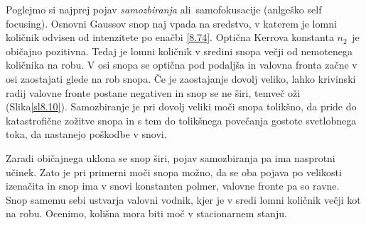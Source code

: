 \documentclass[11pt,fleqn]{book} %
\begin{document}
Poglejmo si najprej pojav \textit{samozbiranja }ali\textit{\ }samofokusacije
(anlgeško self focusing). Osnovni Gaussov snop naj vpada na sredstvo,
v katerem je lomni količnik odvisen od intenzitete po enačbi \ref{8.74}.
Optična Kerrova konstanta $n_{2\text{ }}$je običajno pozitivna. Tedaj
je lomni količnik v sredini snopa večji od nemotenega količnika na
robu. V osi snopa se optična pod podaljša in valovna fronta začne
v osi zaostajati glede na rob snopa. Če je zaostajanje dovolj veliko,
lahko krivinski radij valovne fronte postane negativen in snop se
ne širi, temveč oži (Slika\ref{sl8.10}). Samozbiranje je pri dovolj
veliki moči snopa tolikšno, da pride do katastrofične zožitve snopa
in s tem do tolikšnega povečanja gostote svetlobnega toka, da nastanejo
poškodbe v snovi.

Zaradi običajnega uklona se snop širi, pojav samozbiranja pa ima nasprotni
učinek. Zato je pri primerni moči snopa možno, da se oba pojava po
velikosti izenačita in snop ima v snovi konstanten polmer, valovne
fronte pa so ravne. Snop samemu sebi ustvarja valovni vodnik, kjer
je v sredi lomni količnik večji kot na robu. Ocenimo, kolišna mora
biti moč v stacionarnem stanju.
\end{document}
